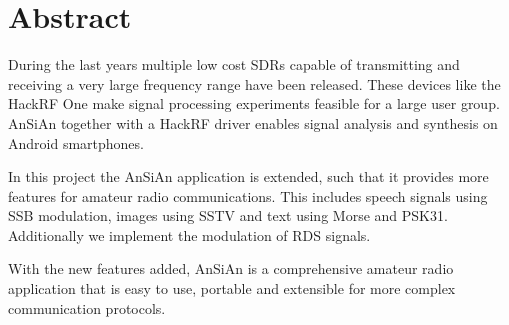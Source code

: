 \begingroup
\let\clearpage\relax
\let\cleardoublepage\relax
\let\cleardoublepage\relax

\chapter*{Abstract}

	During the last years multiple low cost \acp{SDR} capable of transmitting and receiving a very large frequency range have been released. These devices like the HackRF One make signal processing experiments feasible for a large user group. AnSiAn together with a HackRF driver enables signal analysis and synthesis on Android smartphones. 
	
	In this project the \ac{AnSiAn} application is extended, such that it provides more features for amateur radio communications. This includes speech signals using \ac{SSB} modulation, images using \ac{SSTV} and text using Morse and PSK31. Additionally we implement the modulation of \ac{RDS} signals. 
	
	With the new features added, AnSiAn is a comprehensive amateur radio application that is easy to use, portable and extensible for more complex communication protocols. 





\endgroup			

